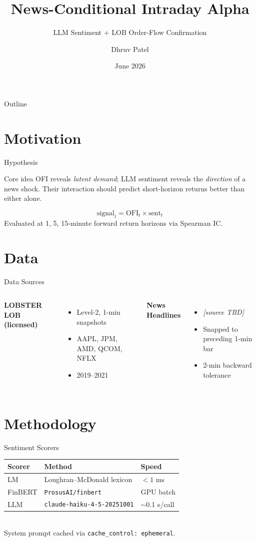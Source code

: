 \documentclass[aspectratio=169, 10pt]{beamer}
\title[LNA-Agent]{News-Conditional Intraday Alpha}
\subtitle{LLM Sentiment + LOB Order-Flow Confirmation}
\author{Dhruv Patel}
\institute{Math 285J — UCLA}
\date{June 2026}
\begin{document}
\begin{frame}
\titlepage
\end{frame}

\begin{frame}{Outline}
\tableofcontents
\end{frame}

\section{Motivation}
\begin{frame}{Hypothesis}
\begin{block}{Core idea}
OFI reveals \emph{latent demand}; LLM sentiment reveals the
\emph{direction} of a news shock.
Their interaction should predict short-horizon returns better than either alone.
\end{block}
\vspace{1em}
\[ \text{signal}_t = \text{OFI}_t \times \text{sent}_t \]
Evaluated at 1, 5, 15-minute forward return horizons via Spearman IC.
\end{frame}

\section{Data}
\begin{frame}{Data Sources}
\begin{columns}
\textbf{LOBSTER LOB (licensed)}
\begin{itemize}
  \item Level-2, 1-min snapshots
  \item AAPL, JPM, AMD, QCOM, NFLX
  \item 2019--2021
\end{itemize}
\textbf{News Headlines}
\begin{itemize}
  \item \textit{[source TBD]}
  \item Snapped to preceding 1-min bar
  \item 2-min backward tolerance
\end{itemize}
\end{columns}
\end{frame}

\section{Methodology}
\begin{frame}{Sentiment Scorers}
\begin{tabular}{lll}
\toprule
Scorer & Method & Speed \\
\midrule
LM & Loughran--McDonald lexicon & $<1$ ms \\
FinBERT & \texttt{ProsusAI/finbert} & GPU batch \\
\alert{LLM} & \texttt{claude-haiku-4-5-20251001} & $\sim$0.1 s/call \\
\bottomrule
\end{tabular}
\vspace{0.5em}\\
System prompt cached via \texttt{cache\_control: ephemeral}.
\end{frame}
\end{document}
